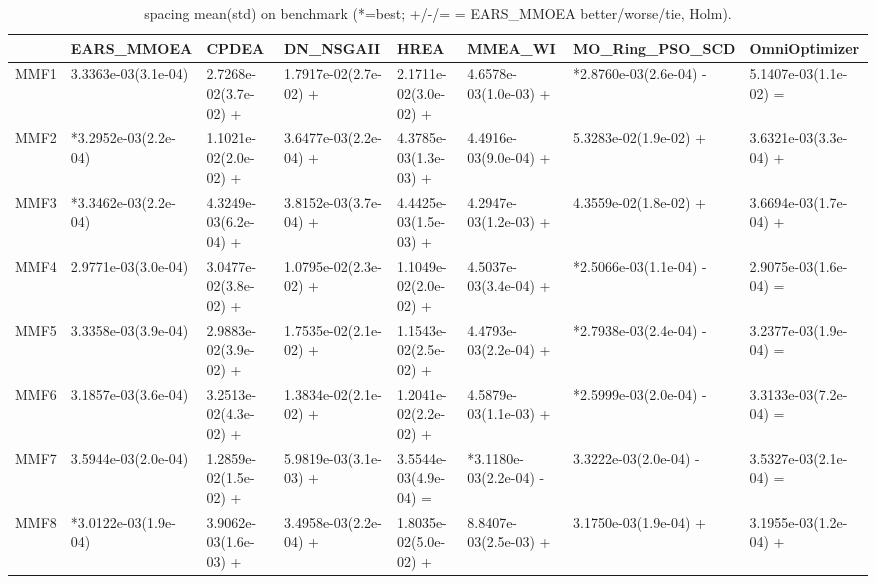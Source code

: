 \begin{table}[t]
\centering
\caption{spacing mean(std) on benchmark (*=best; +/-/= = EARS_MMOEA better/worse/tie, Holm).}
\label{tab:benchmark_spacing}
\begin{tabular}{llllllll}
\toprule
 & EARS\_MMOEA & CPDEA & DN\_NSGAII & HREA & MMEA\_WI & MO\_Ring\_PSO\_SCD & OmniOptimizer \\
\midrule
MMF1 & 3.3363e-03(3.1e-04) & 2.7268e-02(3.7e-02) + & 1.7917e-02(2.7e-02) + & 2.1711e-02(3.0e-02) + & 4.6578e-03(1.0e-03) + & *2.8760e-03(2.6e-04) - & 5.1407e-03(1.1e-02) = \\
MMF2 & *3.2952e-03(2.2e-04) & 1.1021e-02(2.0e-02) + & 3.6477e-03(2.2e-04) + & 4.3785e-03(1.3e-03) + & 4.4916e-03(9.0e-04) + & 5.3283e-02(1.9e-02) + & 3.6321e-03(3.3e-04) + \\
MMF3 & *3.3462e-03(2.2e-04) & 4.3249e-03(6.2e-04) + & 3.8152e-03(3.7e-04) + & 4.4425e-03(1.5e-03) + & 4.2947e-03(1.2e-03) + & 4.3559e-02(1.8e-02) + & 3.6694e-03(1.7e-04) + \\
MMF4 & 2.9771e-03(3.0e-04) & 3.0477e-02(3.8e-02) + & 1.0795e-02(2.3e-02) + & 1.1049e-02(2.0e-02) + & 4.5037e-03(3.4e-04) + & *2.5066e-03(1.1e-04) - & 2.9075e-03(1.6e-04) = \\
MMF5 & 3.3358e-03(3.9e-04) & 2.9883e-02(3.9e-02) + & 1.7535e-02(2.1e-02) + & 1.1543e-02(2.5e-02) + & 4.4793e-03(2.2e-04) + & *2.7938e-03(2.4e-04) - & 3.2377e-03(1.9e-04) = \\
MMF6 & 3.1857e-03(3.6e-04) & 3.2513e-02(4.3e-02) + & 1.3834e-02(2.1e-02) + & 1.2041e-02(2.2e-02) + & 4.5879e-03(1.1e-03) + & *2.5999e-03(2.0e-04) - & 3.3133e-03(7.2e-04) = \\
MMF7 & 3.5944e-03(2.0e-04) & 1.2859e-02(1.5e-02) + & 5.9819e-03(3.1e-03) + & 3.5544e-03(4.9e-04) = & *3.1180e-03(2.2e-04) - & 3.3222e-03(2.0e-04) - & 3.5327e-03(2.1e-04) = \\
MMF8 & *3.0122e-03(1.9e-04) & 3.9062e-03(1.6e-03) + & 3.4958e-03(2.2e-04) + & 1.8035e-02(5.0e-02) + & 8.8407e-03(2.5e-03) + & 3.1750e-03(1.9e-04) + & 3.1955e-03(1.2e-04) + \\
\bottomrule
\end{tabular}
\end{table}
